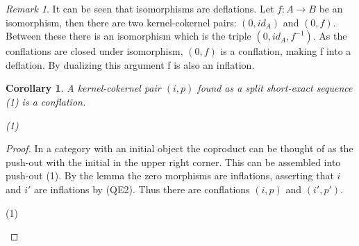 \documentclass[11pt]{article}
\newtheorem{corollary}{Corollary}[theorem]
\theoremstyle{definition}
\theoremstyle{remark}
\newtheorem*{remark}{Remark}
\begin{document}
            \begin{remark}
                It can be seen that isomorphisms are deflations. Let $f:A\rightarrow B$ be an isomorphism, then there are two kernel-cokernel pairs: $(0,id_A)$ and $(0,f)$. Between these there is an isomorphism which is the triple $(0,id_A,f^{-1})$. As the conflations are closed under isomorphism, $(0,f)$ is a conflation, making f into a deflation. By dualizing this argument f is also an inflation.
                \begin{center}
                \end{center}
            \end{remark}

            \begin{corollary}
                A kernel-cokernel pair $(i,p)$ found as a split short-exact sequence (1) is a conflation. 
                
                \begin{center}
                    (1)
                \end{center}
            \end{corollary}

            \begin{proof}
                In a category with an initial object the coproduct can be thought of as the push-out with the initial in the upper right corner. This can be assembled into push-out (1).
                By the lemma the zero morphisms are inflations, asserting that $i$ and $i'$ are inflations by (QE2). Thus there are conflations $(i,p)$ and $(i',p')$.

                \begin{center}
                    (1)
                \end{center}
            \end{proof}
\end{document}
